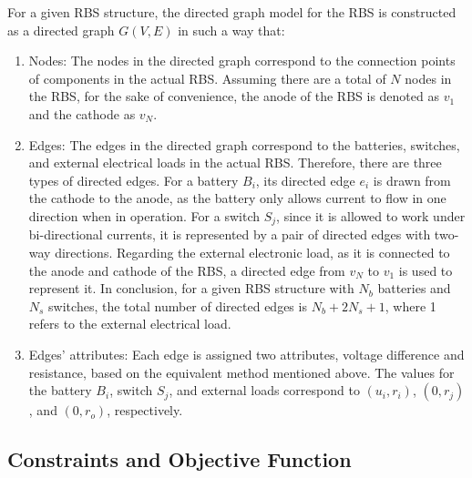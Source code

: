 \documentclass{article}
\begin{document}
For a given RBS structure, the directed graph model for the RBS is constructed as a directed graph $G(V,E)$ in such a way that:
\begin{enumerate}
    \item Nodes:
        The nodes in the directed graph correspond to the connection points of components in the actual RBS. 
        Assuming there are a total of $N$ nodes in the RBS, for the sake of convenience, the anode of the RBS is denoted as $v_1$ and the cathode as $v_N$.
    \item Edges:
        The edges in the directed graph correspond to the batteries, switches, and external electrical loads in the actual RBS.
        Therefore, there are three types of directed edges. 
        For a battery $B_i$, its directed edge $e_i$ is drawn from the cathode to the anode, as the battery only allows current to flow in one direction when in operation.
        For a switch $S_j$, since it is allowed to work under bi-directional currents, it is represented by a pair of directed edges with two-way directions. 
        Regarding the external electronic load, as it is connected to the anode and cathode of the RBS, a directed edge from $v_N$ to $v_1$ is used to represent it. 
        In conclusion, for a given RBS structure with $N_b$ batteries and $N_s$ switches, the total number of directed edges is $N_b+2N_s+1$, where 1 refers to the external electrical load.
    \item Edges' attributes:
        Each edge is assigned two attributes, voltage difference and resistance, based on the equivalent method mentioned above.
        The values for the battery $B_i$, switch $S_j$, and external loads correspond to $(u_i, r_i)$, $(0, r_j)$, and $(0, r_o)$, respectively.
\end{enumerate}

\subsection{Constraints and Objective Function}
\end{document}
